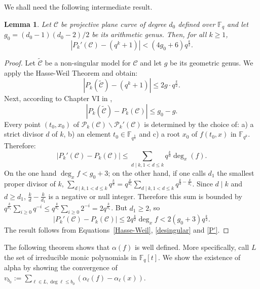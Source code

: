\documentclass[a4wide]{article}
\newcommand{\F}{{\mathbb F}}
\theoremstyle{plain}
\newtheorem{lem}[theo]{Lemma}
\theoremstyle{definition}
\theoremstyle{remark}
\begin{document}
We shall need the following intermediate result.
\begin{lem}\label{P'P} Let $\mathcal{C}$ be projective plane curve of degree
	$d_0$ defined over $\F_q$ 
        and let $g_0=(d_0-1)(d_0-2)/2$ be its arithmetic genus.
	Then, for all $k\geq 1$, 
	\begin{equation}\label{lemme}
		\left|P_k'(\mathcal{C})-(q^k+1)\right|<(4g_0+6)q^{\frac{k}{2}}.
	\end{equation}
\end{lem}
\begin{proof}
    Let $\tilde{\mathcal{C}}$ be a non-singular model for
        $\mathcal{C}$ and let $g$ be its geometric genus.
	We apply the Hasse-Weil Theorem and obtain:
\begin{equation}\label{Hasse-Weil}
	\left| P_k(\tilde{\mathcal{C}})-(q^k+1)\right|\leq 2g\cdot
	q^{\frac{k}{2}}.
\end{equation}
Next, according to Chapter VI in \cite{Ful69},
\begin{equation}\label{desingular}
	|P_k(\tilde{\mathcal{C}})-P_k(\mathcal{C})|\leq g_0-g.
\end{equation}
Every point $(t_0,x_0)$ of $\mathcal{P}_k(\mathcal{C})\backslash
\mathcal{P}_k'(\mathcal{C})$ is determined by the choice of: a) a strict
divisor $d$ of $k$, b) an element $t_0\in \F_{q^{\frac{k}{d}}}$ and c) a root
$x_0$ of $f(t_0,x)$ in $\F_{q^k}$. Therefore:
\begin{equation}\label{raw_lemma}
	\left| P_k'(\mathcal{C})-P_k(\mathcal{C})\right|\leq \sum_{d\mid
	k,1<d\leq k}q^{\frac{k}{d}}\deg_x(f).
\end{equation}
On the one hand $\deg_xf< g_0+3$; on the other hand, if one calls $d_1$ the
smallest proper divisor of $k$, $\sum_{d\mid
k,1<d\leq k}q^{\frac{k}{d}} = q^{\frac{k}{d_1}} \sum_{d\mid
k,1<d\leq k}q^{\frac{k}{d}-\frac{k}{d_1}}$. Since $d\mid k$ and $d\geq d_1$,
$\frac{k}{d}-\frac{k}{d_1}$ is a negative or null integer. Therefore this sum is
bounded by $q^{\frac{k}{d_1}}\sum_{i\geq 0}q^{-i}\leq q^{\frac{k}{d_1}}\sum_{i\geq
0}2^{-i}=2q^{\frac{k}{d_1}}$. But $d_1\geq 2$, so 
\begin{equation}\label{P'}
	\left|P_k'(\mathcal{C})-P_k(\mathcal{C})\right|\leq 2
	q^{\frac{k}{2}}\deg_x f < 2(g_0+3)q^{\frac{k}{2}}.
\end{equation}
The result follows from Equations~\ref{Hasse-Weil}, \ref{desingular} and \ref{P'}.
\end{proof}
The following theorem shows that $\alpha(f)$ is well defined. More
specifically, call $L$
the set of irreducible monic polynomials in $\F_q[t]$.  We show the existence of alpha
by showing the convergence of $v_{b_0}:=\sum_{\ell\in L,\deg
\ell\leq b_0}(\alpha_\ell(f)-\alpha_\ell(x))$.
\end{document}
